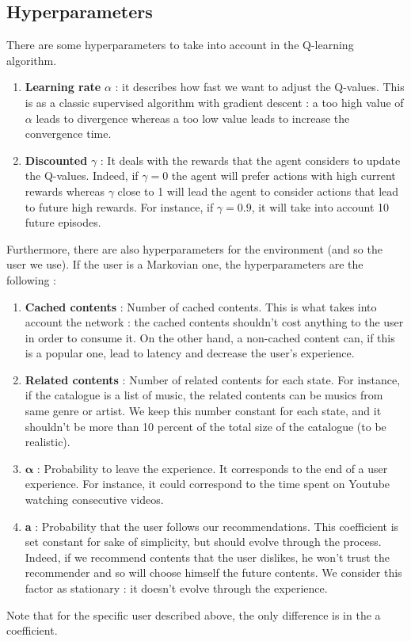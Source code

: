 \documentclass[a4paper]{article}
\begin{document}
    
 \subsection{Hyperparameters}
 There are some hyperparameters to take into account in the Q-learning algorithm. 
 \begin{enumerate}
 	
	\item \textbf{Learning rate } $\alpha$ : it describes how fast we want to adjust the  Q-values. This is as a classic supervised algorithm with gradient descent : a too high value of $\alpha$ leads to divergence whereas a too low value leads to increase the convergence time. 
 	\item \textbf{Discounted } $\gamma$ : It deals with the rewards that the agent considers to update the Q-values. Indeed, if $\gamma = 0$ the agent will prefer actions with high current rewards whereas $\gamma$ close to 1 will lead the agent to consider actions that lead to future high rewards. For instance, if $\gamma = 0.9$, it will take into account 10 future episodes.
	
 \end{enumerate}
 
 	Furthermore, there are also hyperparameters for the environment (and so the user we use). If the user is a Markovian one, the hyperparameters are the following : 
	
	\begin{enumerate}
	
	\item \textbf{Cached contents} : Number of cached contents. This is what takes into account the network : the cached contents shouldn't cost anything to the user in order to consume it. On the other hand, a non-cached content can, if this is a popular one, lead to latency and decrease the user's experience.
	\item \textbf{Related contents} : Number of related contents for each state. For instance, if the catalogue is a list of music, the related contents can be musics from same genre or artist. We keep this number constant for each state, and it shouldn't be more than 10  percent of the total size of the catalogue (to be realistic).
	\item $\mathbf{\alpha}$ : Probability to leave the experience. It corresponds to the end of a user experience. For instance, it could correspond to the time spent on Youtube watching consecutive videos.
	\item \textbf{a} : Probability that the user follows our recommendations. This coefficient is set constant for sake of simplicity, but should evolve through the process. Indeed, if we recommend contents that the user dislikes, he won't trust the recommender and so will choose himself the future contents. We consider this factor as stationary : it doesn't evolve through the experience.
	\end{enumerate}
	Note that for the specific user described above, the only difference is in the a coefficient. 
\end{document}
